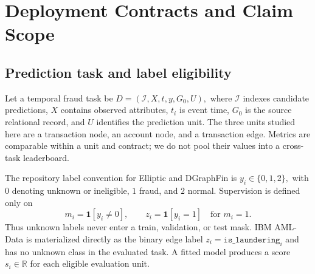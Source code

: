 \section{Deployment Contracts and Claim Scope}
\label{sec:contracts}

\subsection{Prediction task and label eligibility}
Let a temporal fraud task be
\(
D=(\mathcal{I},X,t,y,G_0,U),
\)
where $\mathcal{I}$ indexes candidate predictions, $X$ contains observed attributes, $t_i$ is event time, $G_0$ is the source relational record, and $U$ identifies the prediction unit. The three units studied here are a transaction node, an account node, and a transaction edge. Metrics are comparable within a unit and contract; we do not pool their values into a cross-task leaderboard.

The repository label convention for Elliptic and DGraphFin is
\(
y_i\in\{0,1,2\},
\)
with $0$ denoting unknown or ineligible, $1$ fraud, and $2$ normal. Supervision is defined only on
\begin{equation}
    m_i=\mathbf{1}[y_i\ne 0], \qquad
    z_i=\mathbf{1}[y_i=1] \quad \text{for } m_i=1 .
    \label{eq:eligibility}
\end{equation}
Thus unknown labels never enter a train, validation, or test mask. IBM AML-Data is materialized directly as the binary edge label $z_i=\texttt{is\_laundering}_i$ and has no unknown class in the evaluated task. A fitted model produces a score $s_i\in\mathbb{R}$ for each eligible evaluation unit.

